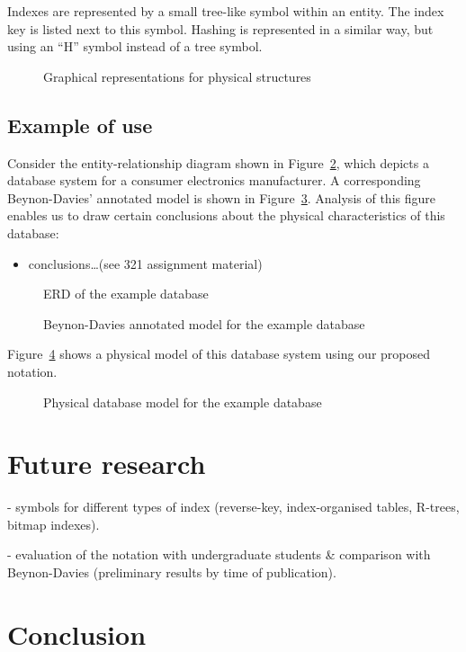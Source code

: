\documentclass{llncs}
\begin{document}
Indexes are represented by a small tree-like symbol within an entity.
The index key is listed next to this symbol. Hashing is represented in a
similar way, but using an ``H'' symbol instead of a tree symbol.

\begin{figure}
	\caption{Graphical representations for physical structures}
	\label{fig-notation}
\end{figure}


\subsection{Example of use}

Consider the entity-relationship diagram shown in Figure~\ref{fig-ERD},
which depicts a database system for a consumer electronics manufacturer.
A corresponding Beynon-Davies' annotated model is shown in
Figure~\ref{fig-Beynon-Davies}. Analysis of this figure enables us to
draw certain conclusions about the physical characteristics of this
database:

\begin{itemize}

	\item conclusions\ldots (see 321 assignment material)

\end{itemize}

\begin{figure}
	\caption{ERD of the example database}
	\label{fig-ERD}
\end{figure}

\begin{figure}
	\caption{Beynon-Davies annotated model for the example database}
	\label{fig-Beynon-Davies}
\end{figure}

Figure~\ref{fig-physical-model} shows a physical model of this database
system using our proposed notation.

\begin{figure}
	\caption{Physical database model for the example database}
	\label{fig-physical-model}
\end{figure}


\section{Future research}
\label{sec-future}

- symbols for different types of index (reverse-key, index-organised
tables, R-trees, bitmap indexes).

- evaluation of the notation with undergraduate students \& comparison
with Beynon-Davies (preliminary results by time of publication).


\section{Conclusion}
\label{sec-conclusion}





\end{document}
